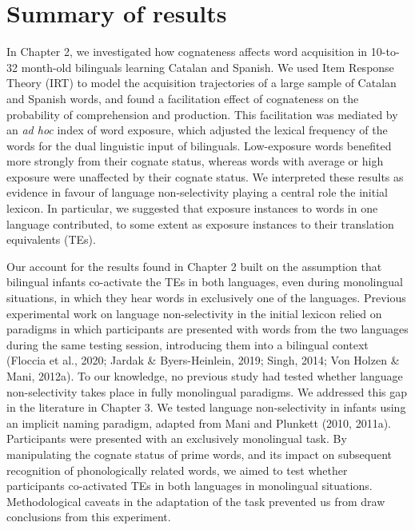 \documentclass[
  12pt,
  b5paperpaper,
  twoside]{scrreprt}
\begin{document}
\hypertarget{summary-of-results}{%
\section{Summary of results}\label{summary-of-results}}

In Chapter 2, we investigated how cognateness affects word acquisition
in 10-to-32 month-old bilinguals learning Catalan and Spanish. We used
Item Response Theory (IRT) to model the acquisition trajectories of a
large sample of Catalan and Spanish words, and found a facilitation
effect of cognateness on the probability of comprehension and
production. This facilitation was mediated by an \emph{ad hoc} index of
word exposure, which adjusted the lexical frequency of the words for the
dual linguistic input of bilinguals. Low-exposure words benefited more
strongly from their cognate status, whereas words with average or high
exposure were unaffected by their cognate status. We interpreted these
results as evidence in favour of language non-selectivity playing a
central role the initial lexicon. In particular, we suggested that
exposure instances to words in one language contributed, to some extent
as exposure instances to their translation equivalents (TEs).

Our account for the results found in Chapter 2 built on the assumption
that bilingual infants co-activate the TEs in both languages, even
during monolingual situations, in which they hear words in exclusively
one of the languages. Previous experimental work on language
non-selectivity in the initial lexicon relied on paradigms in which
participants are presented with words from the two languages during the
same testing session, introducing them into a bilingual context (Floccia
et al., 2020; Jardak \& Byers-Heinlein, 2019; Singh, 2014; Von Holzen \&
Mani, 2012a). To our knowledge, no previous study had tested whether
language non-selectivity takes place in fully monolingual paradigms. We
addressed this gap in the literature in Chapter 3. We tested language
non-selectivity in infants using an implicit naming paradigm, adapted
from Mani and Plunkett (2010, 2011a). Participants were presented with
an exclusively monolingual task. By manipulating the cognate status of
prime words, and its impact on subsequent recognition of phonologically
related words, we aimed to test whether participants co-activated TEs in
both languages in monolingual situations. Methodological caveats in the
adaptation of the task prevented us from draw conclusions from this
experiment.
\end{document}
